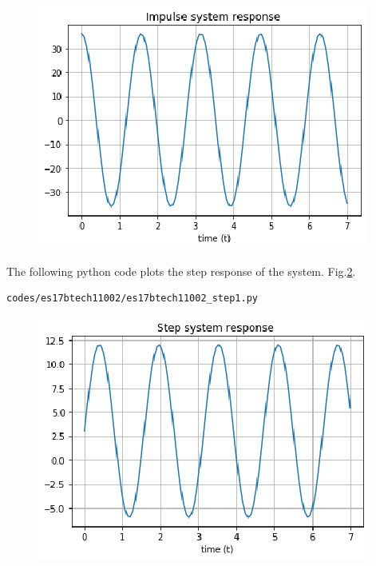 \begin{enumerate}[label=\arabic*.,ref=\theenumi]
\begin{figure}[!ht]
\includegraphics[width=\columnwidth]{./figs/es17btech11002/imp1.eps}
\caption{}
\label{fig:es17btech11002_imp1}
\end{figure}
\renewcommand{\thefigure}{\theenumi.\arabic{figure}}
The following python code plots the step response of the system. Fig.\ref{fig:es17btech11002_step1}.
\begin{lstlisting}
codes/es17btech11002/es17btech11002_step1.py
\end{lstlisting}
\begin{figure}[!ht]
\centering
\includegraphics[width=\columnwidth]{./figs/es17btech11002/step1.eps}
\caption{}
\label{fig:es17btech11002_step1}
\end{figure}
\renewcommand{\thefigure}{\theenumi.\arabic{figure}}

\end{enumerate}
